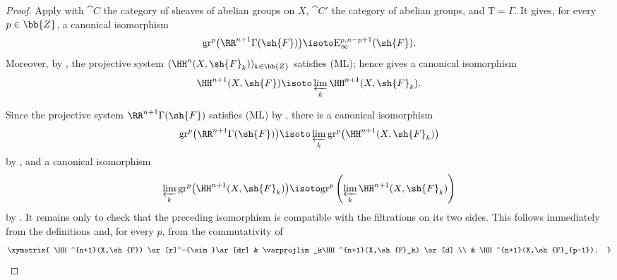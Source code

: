 \begin{proof}
Apply  with $\cat{C}$ the category of sheaves of
abelian groups on $X$, $\cat{C}'$ the category of abelian groups,
and $\mathrm{T}=\Gamma$.
It gives, for every $p\in\bb{Z}$, a canonical isomorphism
\[
  \mathrm{gr}^p\bigl(\RR^{n+1}\Gamma(\sh{F})\bigr)
  \isoto
  \mathrm{E}_\infty^{p,n-p+1}(\sh{F}).
\]
Moreover, by , the projective system
$(\HH^n(X,\sh{F}_k))_{k\in\bb{Z}}$ satisfies {\rm(ML)}; hence
 gives a canonical isomorphism
\[
  \HH^{n+1}(X,\sh{F})
  \isoto
  \varprojlim_k\HH^{n+1}(X,\sh{F}_k).
\]

Since the projective system
$\RR^{n+1}\Gamma(\sh{F})$ satisfies {\rm(ML)} by
, there is a canonical isomorphism
\[
  \mathrm{gr}^p\bigl(\RR^{n+1}\Gamma(\sh{F})\bigr)
  \isoto
  \varprojlim_k
  \mathrm{gr}^p\bigl(\HH^{n+1}(X,\sh{F}_k)\bigr)
\]
by , and a canonical isomorphism
\[
  \varprojlim_k
  \mathrm{gr}^p\bigl(\HH^{n+1}(X,\sh{F}_k)\bigr)
  \isoto
  \mathrm{gr}^p\left(
    \varprojlim_k\HH^{n+1}(X,\sh{F}_k)
  \right)
\]
by .
It remains only to check that the preceding isomorphism is
compatible with the filtrations on its two sides.
This follows immediately from the definitions and, for every $p$,
from the commutativity of
\[
  \xymatrix{
    \HH^{n+1}(X,\sh{F})
      \ar[r]^-{\sim}\ar[dr]
    &
    \varprojlim_k\HH^{n+1}(X,\sh{F}_k)
      \ar[d]
    \\
    &
    \HH^{n+1}(X,\sh{F}_{p-1}).
  }
\]
\end{proof}

